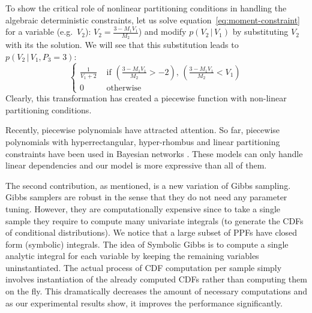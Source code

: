 \documentclass[letterpaper]{article}
\newcommand{\case}[2]{#2 &\text{ if } #1}%
\newcommand{\otherwise}[1]{#1 &\text{ otherwise}}
\newcommand{\pr}{p}
\begin{document}
To show the critical role of nonlinear partitioning conditions in handling the algebraic deterministic constraints, 
let us solve equation~\ref{eq:moment-constraint} for a variable (e.g.\ $V_2$):
$V_2 = \frac{3 - M_1 V_1}{M_2}$) and modify $\pr(V_2 \,|\, V_1)$ by substituting $V_2$ with its the solution.
We will see that this substitution leads to $\pr(V_2 \,|\, V_1, P_3 = 3)$:
\begin{equation}
\label{e:fractional-constraint}
\begin{cases}
  \case{(\frac{3 - M_1 V_1}{M_2} > -2) , \, (\frac{3 - M_1 V_1}{M_2} < V_1)}{\frac{1}{V_1 +2}}\\
  \otherwise{0}
  \end{cases}
\end{equation}
Clearly, this transformation has created a piecewise function with non-linear partitioning conditions.

Recently, piecewise polynomials have attracted attention.
So far, piecewise polynomials with hyperrectangular, hyper-rhombus and linear partitioning constraints have been used in Bayesian networks \cite{shenoy2011inference,shenoy2012two,Sanner:12}.
These models can only handle linear dependencies and 
our model is more expressive than all of them. 

The second contribution, as mentioned, is a new variation of Gibbs sampling.  
Gibbs samplers are robust in the sense that they do not need any parameter tuning.
However, they are computationally expensive since to take a single sample they require to compute many univariate integrals (to generate the CDFs of conditional distributions).
We notice that a large subset of PPFs have closed form (symbolic) integrals. 
The idea of Symbolic Gibbs is to compute a single analytic integral for each variable by keeping the remaining variables uninstantiated. 
The actual process of CDF computation per sample  
simply involves instantiation of the already computed CDFs rather than computing them on the fly.
This dramatically decreases the amount of necessary computations and as our experimental results show, it improves the performance significantly.
\end{document}
